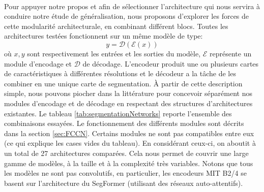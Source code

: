  \\
Pour appuyer notre propos et afin de sélectionner l'architecture qui nous servira à conduire notre étude de généralisation, nous proposons d'explorer les forces de cette modularité architecturale, en combinant différent blocs. Toutes les architectures testées fonctionnent sur un même modèle de type:
\begin{equation}
	y = \mathcal{D}(\mathcal{E}(x))
\end{equation}
où $x, y$ sont respectivement les entrées et les sorties du modèle, $\mathcal{E}$ représente un module d'encodage et $\mathcal{D}$ de décodage. L'encodeur produit une ou plusieurs cartes de caractéristiques à différentes résolutions et le décodeur a la tâche de les combiner en une unique carte de segmentation. À partir de cette description simple, nous pouvons piocher dans la littérature pour concevoir séparément nos modules d'encodage et de décodage en respectant des structures d'architectures existantes. Le tableau \ref{tab:segmentationNetworks} reporte l'ensemble des combinaisons essayées. Le fonctionnement des différents modules sont décrits dans la section \ref{sec:FCCN}. Certains modules ne sont pas compatibles entre eux (ce qui explique les cases vides du tableau). En considérant ceux-ci, on aboutit à un total de 27 architectures comparées.
Cela nous permet de couvrir une large gamme de modèles, à la taille et à la complexité très variables. Notons que tous les modèles ne sont pas convolutifs, en particulier, les encodeurs MIT B2/4 se basent sur l'architecture du SegFormer (utilisant des réseaux auto-attentifs).

